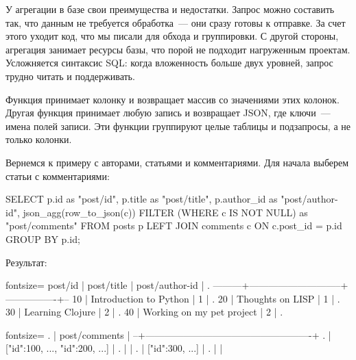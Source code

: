 У агрегации в базе свои преимущества и недостатки. Запрос можно составить так, что данным не требуется обработка~--- они сразу готовы к отправке. За счет этого уходит код, что мы писали для обхода и группировки. С другой стороны, агрегация занимает ресурсы базы, что порой не подходит нагруженным проектам. Усложняется синтаксис SQL: когда вложенность больше двух уровней, запрос трудно читать и поддерживать.

Функция  принимает колонку и возвращает массив  со значениями этих колонок. Другая функция  принимает любую запись и возвращает JSON, где ключи~--- имена полей записи. Эти функции группируют целые таблицы и подзапросы, а не только колонки.

Вернемся к примеру с авторами, статьями и комментариями. Для начала выберем статьи с комментариями:

\begin{english}
  \begin{sql/lines}
SELECT
  p.id        as "post/id",
  p.title     as "post/title",
  p.author_id as "post/author-id",
  json_agg(row_to_json(c)) FILTER
          (WHERE c IS NOT NULL) as "post/comments"
FROM posts p
LEFT JOIN comments c ON c.post_id = p.id
GROUP BY p.id;
  \end{sql/lines}
\end{english}

Результат:

\begin{english}
  \begin{text*}{fontsize=\small}
 post/id |         post/title          | post/author-id | .
---------+-----------------------------+----------------+--
      10 | Introduction to Python      |              1 | .
      20 | Thoughts on LISP            |              1 | .
      30 | Learning Clojure            |              2 | .
      40 | Working on my pet project   |              2 | .
  \end{text*}
\end{english}

\begin{english}
  \begin{text*}{fontsize=\small}
. |                    post/comments                   |
--+----------------------------------------------------+
. | [{"id":100, ...}, {"id":200, ...}]                 |
. |                                                    |
. | [{"id":300, ...}]                                  |
. |                                                    |
  \end{text*}
\end{english}


